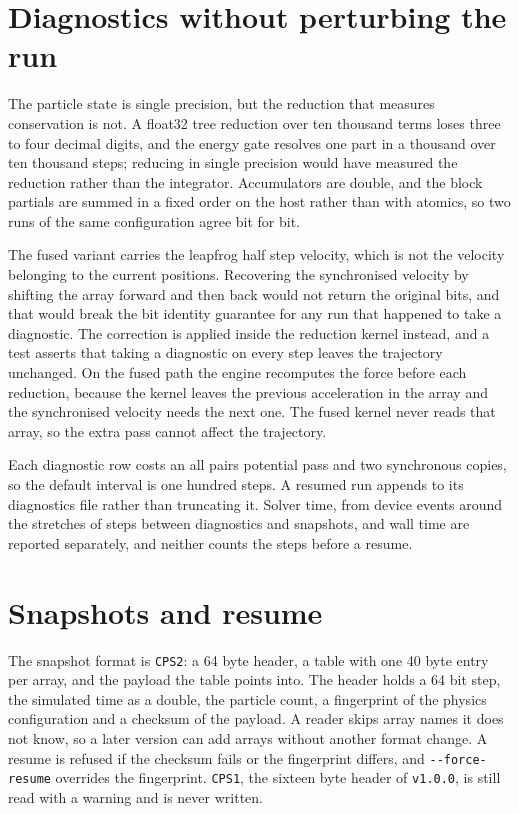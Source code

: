 \section{Diagnostics without perturbing the run}

The particle state is single precision, but the reduction that measures
conservation is not. A float32 tree reduction over ten thousand terms loses
three to four decimal digits, and the energy gate resolves one part in a
thousand over ten thousand steps; reducing in single precision would have
measured the reduction rather than the integrator. Accumulators are double, and
the block partials are summed in a fixed order on the host rather than with
atomics, so two runs of the same configuration agree bit for bit.

The fused variant carries the leapfrog half step velocity, which is not the
velocity belonging to the current positions. Recovering the synchronised
velocity by shifting the array forward and then back would not return the
original bits, and that would break the bit identity guarantee for any run that
happened to take a diagnostic. The correction is applied inside the reduction
kernel instead, and a test asserts that taking a diagnostic on every step
leaves the trajectory unchanged. On the fused path the engine recomputes the force before
each reduction, because the kernel leaves the previous acceleration in the array and the
synchronised velocity needs the next one. The fused kernel never reads that array, so the
extra pass cannot affect the trajectory.

Each diagnostic row costs an all pairs potential pass and two synchronous copies, so the
default interval is one hundred steps. A resumed run appends to its diagnostics file rather
than truncating it. Solver time, from device events around the stretches of steps between
diagnostics and snapshots, and wall time are reported separately, and neither counts the
steps before a resume.

\section{Snapshots and resume}

The snapshot format is \texttt{CPS2}: a 64 byte header, a table with one 40 byte entry per
array, and the payload the table points into. The header holds a 64 bit step, the simulated
time as a double, the particle count, a fingerprint of the physics configuration and a
checksum of the payload. A reader skips array names it does not know, so a later version can
add arrays without another format change. A resume is refused if the checksum fails or the
fingerprint differs, and \verb|--force-resume| overrides the fingerprint. \texttt{CPS1}, the
sixteen byte header of \texttt{v1.0.0}, is still read with a warning and is never written.

